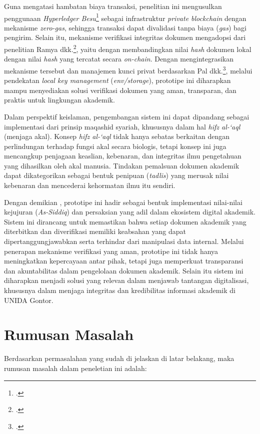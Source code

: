 	Guna mengatasi hambatan biaya transaksi, penelitian ini mengusulkan penggunaan \textit{Hyperledger Besu}\footcite{HyperledgerFoundation} sebagai infrastruktur \textit{private blockchain} dengan mekanisme \textit{zero-gas}, sehingga transaksi dapat divalidasi tanpa biaya (\textit{gas}) bagi pengirim. Selain itu, mekanisme verifikasi integritas dokumen mengadopsi dari penelitian Ramya dkk.\footcite{Ramya2026}, yaitu dengan membandingkan nilai \textit{hash} dokumen lokal dengan nilai \textit{hash} yang tercatat secara \textit{on-chain}. Dengan mengintegrasikan mekanisme tersebut dan manajemen kunci privat berdasarkan Pal dkk.\footcite{Pal2021}, melalui pendekatan \textit{local key management} (\textit{env/storage}), prototipe ini diharapkan mampu menyediakan solusi verifikasi dokumen yang aman, transparan, dan praktis untuk lingkungan akademik.



	Dalam perspektif keislaman, pengembangan sistem ini dapat dipandang sebagai implementasi dari prinsip maqashid syariah, khususnya dalam hal \textit{hifz al-‘aql} (menjaga akal). Konsep  \textit{hifz al-‘aql} tidak hanya sebatas berkaitan dengan perlindungan terhadap fungsi akal secara biologis, tetapi konsep ini juga mencangkup penjagaan keaslian, kebenaran, dan integritas ilmu pengetahuan yang dihasilkan oleh akal manusia. Tindakan pemalsuan dokumen akademik dapat dikategorikan sebagai bentuk penipuan (\textit{tadlis}) yang merusak nilai kebenaran  dan mencederai kehormatan ilmu itu sendiri. 

	Dengan demikian , prototipe ini hadir sebagai bentuk implementasi nilai-nilai kejujuran (\textit{As-Siddiq}) dan persaksian yang adil dalam ekosistem digital akademik. Sistem ini dirancang untuk memastikan bahwa setiap dokumen akademik yang diterbitkan dan diverifikasi memiliki keabsahan yang dapat dipertanggungjawabkan serta terhindar dari manipulasi data internal. Melalui penerapan mekanisme verifikasi yang aman, prototipe ini tidak hanya meningkatkan kepercayaan antar pihak, tetapi juga memperkuat transparansi dan akuntabilitas dalam pengelolaan dokumen akademik. Selain itu sistem ini diharapkan menjadi solusi yang relevan dalam menjawab tantangan digitalisasi, khususnya dalam menjaga integritas dan kredibilitas informasi akademik di UNIDA Gontor.

	\section{Rumusan Masalah}
	Berdasarkan permasalahan yang sudah di jelaskan di latar belakang, maka rumusan masalah dalam peneletian ini adalah:

